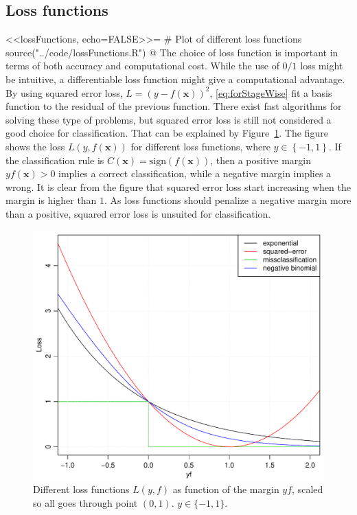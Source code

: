 \subsection{Loss functions}
\label{sub:Loss functions}
<<lossFunctions, echo=FALSE>>=
# Plot of different loss functions
source("../code/lossFunctions.R")
@
The choice of loss function is important in terms of both accuracy and computational cost. While the use of $0/1$ loss might be intuitive, a differentiable loss function might give a computational advantage. By using squared error loss, $L = (y - f(\mathbf{x}))^2$, \eqref{eq:forStageWise} fit a basis function to the residual of the previous function. There exist fast algorithms for solving these type of problems, but squared error loss is still not considered a good choice for classification. That can be explained by Figure~\ref{fig:lossFunctions}. The figure shows the loss $L(y, f(\mathbf{x}))$ for different loss functions, where $y \in \left\{ -1, 1 \right\}$. If the classification rule is $C(\mathbf{x}) = \mathrm{sign}(f(\mathbf{x}))$, then a positive margin $y f(\mathbf{x}) > 0$ implies a correct classification, while a negative margin implies a wrong. It is clear from the figure that squared error loss start increasing when the margin is higher than $1$. As loss functions should penalize a negative margin more than a positive, squared error loss is unsuited for classification.
%
\begin{figure}[htbp]
\begin{center}
    \includegraphics[scale=0.5]{./figures/lossFunctions.pdf}
\end{center}
\caption{Different loss functions $L(y, f)$ as function of the margin $yf$, scaled so all goes through point $(0, 1)$. $y \in \{-1, 1\}$.}
\label{fig:lossFunctions}
\end{figure}
%

